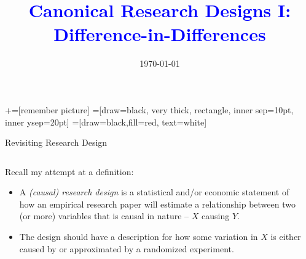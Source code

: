 \documentclass[notes,11pt, aspectratio=169]{beamer}
\title[]{\textcolor{blue}{Canonical Research Designs I:\\ Difference-in-Differences}}
\author[PGP]{}
\institute[FRBNY]{\small{\begin{tabular}{c}
  Paul Goldsmith-Pinkham  \\
\end{tabular}}}
\date{\today}
\newenvironment{wideitemize}{\itemize\addtolength{\itemsep}{10pt}}{\enditemize}
\begin{document}
\newcommand\marktopleft[1]{%
    \tikz[overlay,remember picture] 
        \node (marker-#1-a) at (-.3em,.3em) {};%
}
\newcommand\markbottomright[2]{%
    \tikz[overlay,remember picture] 
        \node (marker-#1-b) at (0em,0em) {};%
}
+=[remember picture] 
 =[draw=black, very thick, rectangle, inner sep=10pt, inner ysep=20pt]
 =[draw=black,fill=red, text=white]

\begin{frame}
\maketitle
\end{frame}

\begin{frame}{Revisiting Research Design}
  \begin{columns}[T] %
    \begin{column}{0.5\textwidth}
      \begin{wideitemize}
      \item<1-> Recall my attempt at a definition:
        \begin{itemize}
        \item A \emph{(causal) research design} is a statistical
          and/or economic statement of how an empirical research paper
          will estimate a relationship between two (or more) variables
          that is causal in nature -- $X$ causing $Y$.
        \item The design should have a description for how some
          variation in $X$ is either caused by or approximated by a
          randomized experiment.
        \end{itemize}
      \end{wideitemize}
    \end{column}%
    \hfill%
    \begin{column}{.5\textwidth}
    \end{column}%
  \end{columns}
\end{frame}
\end{document}
